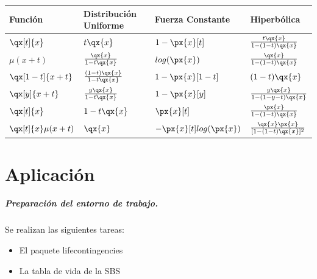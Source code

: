 \documentclass[12pt]{report}
\begin{document}
\begin{tabular}{ |p{2cm}|p{4cm}|p{4cm}|p{3cm}|  }
  \hline
  \centering Funci\'on & 
   Distribuci\'on Uniforme & 
  Fuerza Constante & 
  Hiperb\'olica \\
  \hline %
    \centering $\qx[t]{x}$ &
    \centering $t\qx{x}$ &
    \centering $1-\px{x}[t]$ &
    $\frac{t\qx{x}}{1-(1-t)\qx{x}}$ \\
  
  \hline %
    \centering $\mu(x+t)$  & 
    \centering $\frac{\qx{x}}{1-t\qx{x}}$ &
    \centering $log(\px{x})$ &
    $\frac{\qx{x}}{1-(1-t)\qx{x}}$ \\
  
  \hline %
    \centering $\qx[1-t]{x+t}$ & 
    \centering $\frac{(1-t)\qx{x}}{1-t\qx{x}}$ & 
    \centering $1-\px{x}[1-t]$ &  
    $(1-t)\qx{x}$ \\
  
  \hline %
    \centering $\qx[y]{x+t}$ &
    \centering $\frac{y\qx{x}}{1-t\qx{x}}$ & 
    \centering $1-\px{x}[y]$ &  
    $\frac{y\qx{x}}{1-(1-y-t)\qx{x}}$ \\
  
  \hline %
    \centering $\qx[t]{x}$ & 
    \centering $1-t\qx{x}$ & 
    \centering $\px{x}[t]$ &  
    $\frac{\px{x}}{1-(1-t)\qx{x}}$ \\
    
  \hline %
    \centering $\qx[t]{x}\mu(x+t)$ & 
    \centering $\qx{x}$ & 
    \centering $-\px{x}[t]log(\px{x})$ &  
    $\frac{\qx{x}\px{x}}{[1-(1-t)\qx{x}]^2}$ \\
  \hline
\end{tabular}


\chapter{Aplicaci\'on}

\paragraph{Preparaci\'on del entorno de trabajo.}Se realizan las siguientes tareas:
\begin{itemize}
\item El paquete lifecontingencies
\item La tabla de vida de la SBS
\end{itemize}
\end{document}
